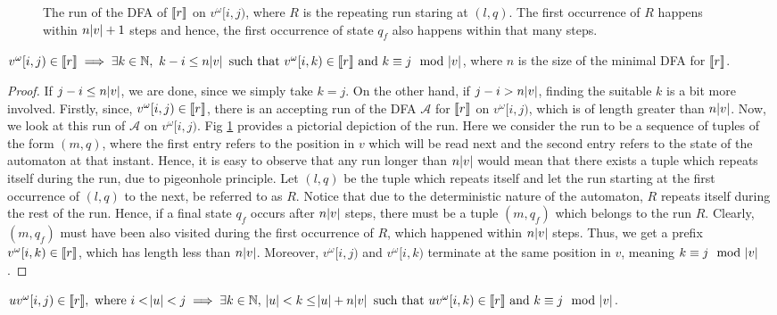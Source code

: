 \begin{figure}
\begin{tikzpicture}[x=0.75pt,y=0.75pt,yscale=-1,xscale=1]
\end{tikzpicture}


    \caption{The run of the DFA of $\sema{r}$ on $v^\omega[i,j)$, where $R$ is the repeating run staring at $(l,q)$. The first occurrence of $R$ happens within $n\abs{v}+1$ steps and hence, the first occurrence of state $q_f$ also happens within that many steps.}
    \label{fig:lemma3}
\end{figure}

\begin{lemma}\label{lem:bound-len_match}
$v^{\omega}[i,j)\in \sema{r}\implies \exists k\in\mathbb{N},\ k-i\leq n\abs{v} \text{ such that } v^\omega[i,k)\in \sema{r} \text{ and } k\equiv j \mod \abs{v}$, where $n$ is the size of the minimal DFA for $\sema{r}$.
\end{lemma}
\begin{proof}
If $j-i\leq n\abs{v}$, we are done, since we simply take $k=j$. On the other hand, if $j-i>n\abs{v}$, finding the suitable $k$ is a bit more involved. Firstly, since, $v^{\omega}[i,j)\in \sema{r}$, there is an accepting run of the DFA $\mathcal{A}$ for $\sema{r}$ on $v^{\omega}[i,j)$, which is of length greater than $n\abs{v}$. Now, we look at this run of $\mathcal{A}$ on $v^\omega[i,j)$. Fig \ref{fig:lemma3} provides a pictorial depiction of the run. Here we consider the run to be a sequence of tuples of the form $(m,q)$, where the first entry refers to the position in $v$ which will be read next and the second entry refers to the state of the automaton at that instant. Hence, it is easy to observe that any run longer than $n\abs{v}$ would mean that there exists a tuple which repeats itself during the run, due to pigeonhole principle. Let $(l,q)$ be the tuple which repeats itself and let the run starting at the first occurrence of $(l,q)$ to the next, be referred to as $R$. Notice that due to the deterministic nature of the automaton, $R$ repeats itself during the rest of the run. Hence, if a final state $q_f$ occurs after $n\abs{v}$ steps, there must be a tuple $(m, q_f)$ which belongs to the run $R$. Clearly, $(m, q_f)$ must have been also visited during the first occurrence of $R$, which happened within $n\abs{v}$ steps. Thus, we get a prefix $v^\omega[i,k)\in \sema{r}$, which has length less than $n\abs{v}$. Moreover, $v^\omega[i,j)$ and $v^\omega[i,k)$ terminate at the same position in $v$, meaning $k\equiv j \mod \abs{v}$.


\end{proof}

\begin{corollary}\label{cor:bound-length_match_uv}
$uv^{\omega}[i,j)\in \sema{r}, \text{ where } i<\abs{u}< j \implies \exists k\in\mathbb{N},\ \abs{u}<k\leq\abs{u}+n\abs{v} \text{ such that } uv^\omega[i,k)\in \sema{r} \text{ and } k\equiv j \mod \abs{v}$.
\end{corollary}

